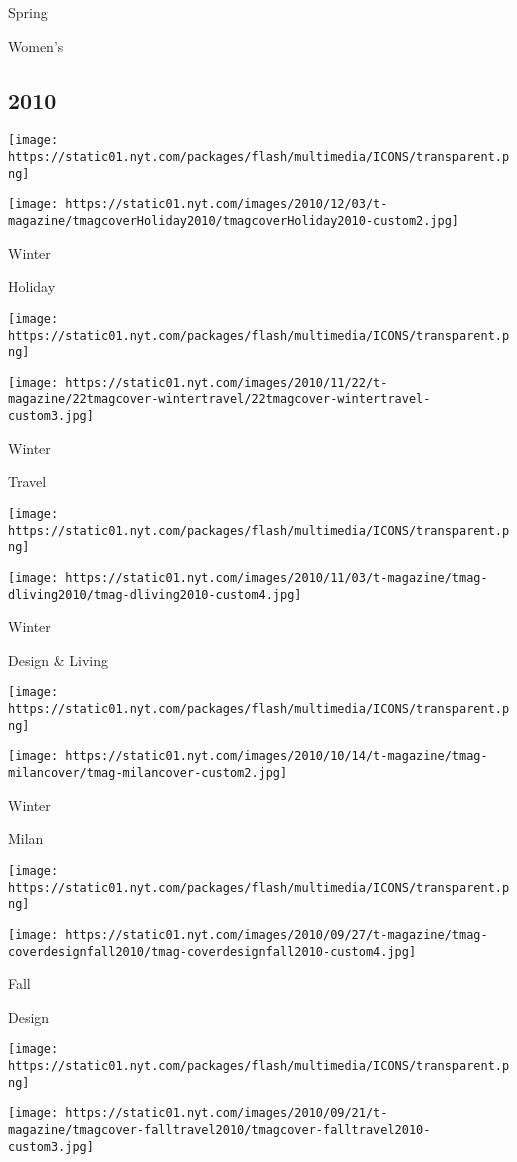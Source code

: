 Spring

Women's

\hypertarget{2010}{%
\subsection{2010}\label{2010}}

\texttt{[image: https://static01.nyt.com/packages/flash/multimedia/ICONS/transparent.png]}

\texttt{[image: https://static01.nyt.com/images/2010/12/03/t-magazine/tmagcoverHoliday2010/tmagcoverHoliday2010-custom2.jpg]}

Winter

Holiday

\texttt{[image: https://static01.nyt.com/packages/flash/multimedia/ICONS/transparent.png]}

\texttt{[image: https://static01.nyt.com/images/2010/11/22/t-magazine/22tmagcover-wintertravel/22tmagcover-wintertravel-custom3.jpg]}

Winter

Travel

\texttt{[image: https://static01.nyt.com/packages/flash/multimedia/ICONS/transparent.png]}

\texttt{[image: https://static01.nyt.com/images/2010/11/03/t-magazine/tmag-dliving2010/tmag-dliving2010-custom4.jpg]}

Winter

Design \& Living

\texttt{[image: https://static01.nyt.com/packages/flash/multimedia/ICONS/transparent.png]}

\texttt{[image: https://static01.nyt.com/images/2010/10/14/t-magazine/tmag-milancover/tmag-milancover-custom2.jpg]}

Winter

Milan

\texttt{[image: https://static01.nyt.com/packages/flash/multimedia/ICONS/transparent.png]}

\texttt{[image: https://static01.nyt.com/images/2010/09/27/t-magazine/tmag-coverdesignfall2010/tmag-coverdesignfall2010-custom4.jpg]}

Fall

Design

\texttt{[image: https://static01.nyt.com/packages/flash/multimedia/ICONS/transparent.png]}

\texttt{[image: https://static01.nyt.com/images/2010/09/21/t-magazine/tmagcover-falltravel2010/tmagcover-falltravel2010-custom3.jpg]}

